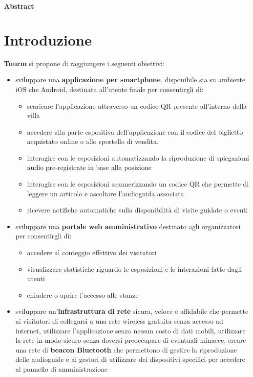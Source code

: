 \documentclass[12pt]{article}
\begin{document}
\newpage

\thispagestyle{plain}
\begin{center}
    \vfill
    \Huge
    \textbf{Abstract}
    \vspace{2cm}

\end{center}

\vfill


\newpage
\tableofcontents
\newpage

\section{Introduzione}
\textbf{Tourm} si propone di raggiungere i seguenti obiettivi:
\begin{itemize}
	\item sviluppare una \textbf{applicazione per smartphone}, disponibile sia su ambiente iOS che Android, destinata all’utente finale per consentirgli di:
	\begin{itemize}
	    \item scaricare l'applicazione attraverso un codice QR presente all'interno della villa
		\item accedere alla parte espositiva dell'applicazione con il codice del biglietto acquistato online o allo sportello di vendita.  
		\item interagire con le esposizioni automatizzando la riproduzione di spiegazioni audio pre-registrate in base alla posizione
		\item interagire con le esposizioni scannerizzando un codice QR che permette di leggere un articolo e ascoltare l'audioguida associata
		\item ricevere notifiche automatiche sulla disponibilità di visite guidate o eventi
	\end{itemize}
    \item sviluppare una \textbf{portale web amministrativo} destinato agli organizzatori per consentirgli di:
	\begin{itemize}
	    \item accedere al conteggio effettivo dei visitatori
		\item visualizzare statistiche riguardo le esposizioni e le interazioni fatte dagli utenti 
		\item chiudere o aprire l’accesso alle stanze
	\end{itemize}
    \item sviluppare un'\textbf{infrastruttura di rete} sicura, veloce e affidabile che permette ai visitatori di collegarsi a una rete wireless gratuita senza accesso ad internet, utilizzare l'applicazione senza nessun costo di dati mobili, utilizzare la rete in modo sicuro senza doversi preoccupare di eventuali minacce, creare una rete di \textbf{beacon Bluetooth} che permettono di gestire la riproduzione delle audioguide 
    e ai gestori di utilizzare dei dispositivi specifici per accedere al pannello di amministrazione
\end{itemize}
\end{document}
